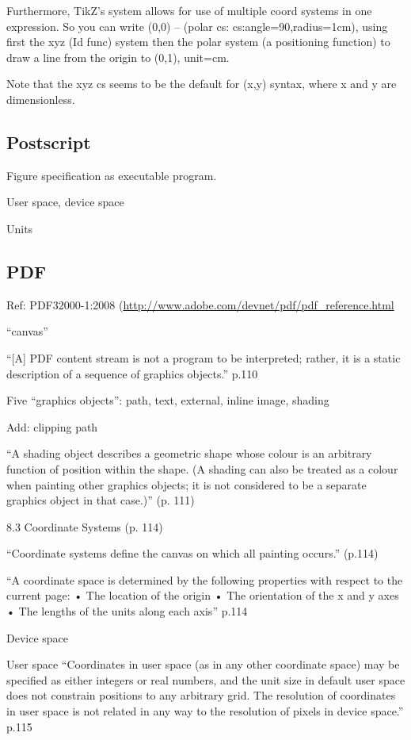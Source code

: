 \documentclass[12pt]{tufte-handout}
\numberwithin{equation}{subsection}
\numberwithin{equation}{subsection}
\begin{document}
\begin{appendices}
    Furthermore, TikZ's system allows for use of multiple coord systems in
    one expression.  So you can write (0,0) -- (polar cs:
    cs:angle=90,radius=1cm), using first the xyz (Id func) system then the
    polar system (a positioning function) to draw a line from the origin
    to (0,1), unit=cm.

    Note that the xyz cs seems to be the default for (x,y) syntax, where x
    and y are dimensionless.

    \subsection{Postscript}

    Figure specification as executable program.

    User space, device space

    Units

    \subsection{PDF}

    Ref:  PDF32000-1:2008 (\url{http://www.adobe.com/devnet/pdf/pdf\_reference.html}

    ``canvas''

    ``[A] PDF content stream is not a program to be interpreted; rather, it is a static description of a sequence of graphics objects.'' p.110

    Five ``graphics objects'': path, text, external, inline image, shading

    Add: clipping path

    ``A shading object describes a geometric shape whose colour is an arbitrary function of position within the shape. (A shading can also be treated as a colour when painting other graphics objects; it is not considered to be a separate graphics object in that case.)'' (p. 111)


    8.3 Coordinate Systems (p. 114)

    ``Coordinate systems define the canvas on which all painting occurs.'' (p.114)

    ``A coordinate space is determined by the following properties with respect to the current page:
    • The location of the origin
    • The orientation of the x and y axes
    • The lengths of the units along each axis'' p.114

    Device space

    User space
    ``Coordinates in user space (as in any other coordinate space) may be specified as either integers or real numbers, and the unit size in default user space does not constrain positions to any arbitrary grid. The resolution of coordinates in user space is not related in any way to the resolution of pixels in device space.'' p.115


\end{appendices}
\end{document}
